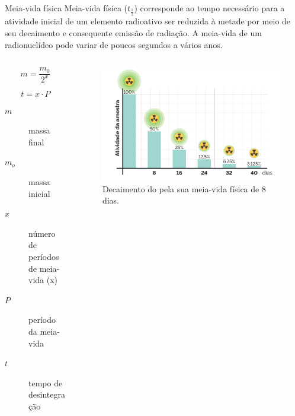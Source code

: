 \documentclass[presentation,professionalfonts,aspectratio=169]{beamer}
\begin{document}
\begin{frame}[label={sec:org7ca3045}]{Meia-vida física}
Meia-vida física (\(t_{\frac{1}{2}}\)) corresponde ao tempo necessário para a atividade inicial de um elemento radioativo ser reduzida à metade por meio de seu decaimento e consequente emissão de radiação. A meia-vida de um radionuclídeo pode variar de poucos segundos a vários anos.



\begin{columns}
\begin{column}{0.45\columnwidth}
\begin{equation}
m=\frac{m_0}{2^x}
\end{equation}

\begin{equation}
t=x\cdot P
\end{equation}

\begin{description}
\item[{\(m\)}] massa final
\item[{\(m_o\)}] massa inicial
\item[{\(x\)}] número de períodos de meia-vida (x)
\item[{\(P\)}] período da meia-vida
\item[{\(t\)}] tempo de desintegração
\end{description}
\end{column}



\begin{column}{0.45\columnwidth}
\begin{figure}[H]
\centering
\includegraphics[scale=0.21]{FQ/Radioatividade/meia-vida.png}
\caption{\label{fig:org238a297}Decaimento do    pela sua meia-vida física de 8 dias.}
\end{figure}
\end{column}
\end{columns}
\end{frame}
\end{document}
